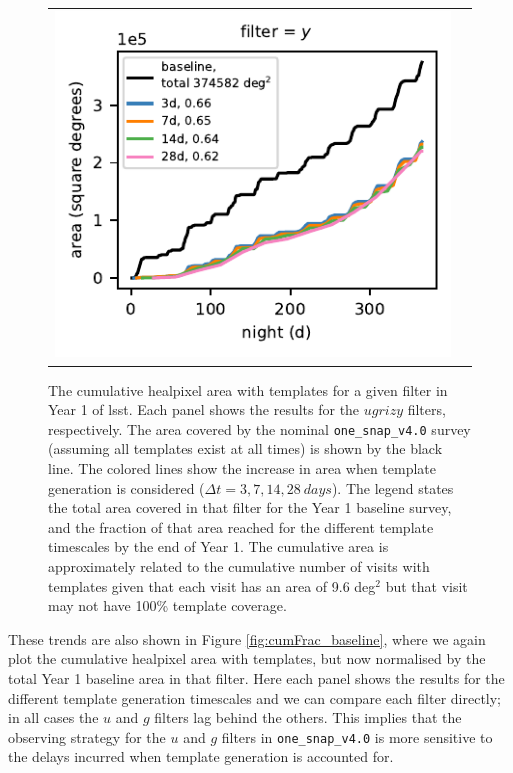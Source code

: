 \documentclass[preprintm,linenumbers]{aastex631}
\newcommand{\baseline}{\texttt{one\_snap\_v4.0}\xspace}
\begin{document}
\begin{figure}
\begin{tabular}{@{}c@{}c@{}}
				\includegraphics{results/first_year_one_snap_v4_0_10yrs_db_noDD_noTwi_cum_baseline_y.pdf} \\
			\end{tabular}
			\caption{The cumulative healpixel area with templates for a given filter in Year 1 of \gls*{lsst}.
				Each panel shows the results for the $ugrizy$ filters, respectively.
				The area covered by the nominal \baseline survey (assuming all templates exist at all times) is shown by the black line.
				The colored lines show the increase in area when template generation is considered ($\Delta t = 3, 7, 14, 28\ \si{days}$).
				The legend states the total area covered in that filter for the Year 1 baseline survey, and the fraction of that area reached for the different template timescales by the end of Year 1.
				The cumulative area is approximately related to the cumulative number of visits with templates given that each visit has an area of 9.6 deg$^2$ but that visit may not have 100\% template coverage.
    }
			\label{fig:cum_baseline_filter}
			
		\end{figure}
  
		These trends are also shown in Figure \ref{fig:cumFrac_baseline}, where we again plot the cumulative healpixel area with templates,  but now normalised by the total Year 1 baseline area in that filter.
		Here each panel shows the results for the different template generation timescales and we can compare each filter directly; in all cases the $u$ and $g$ filters lag behind the others.
		This implies that the observing strategy for the $u$ and $g$ filters in \baseline is more sensitive to the delays incurred when template generation is accounted for.
\end{document}
